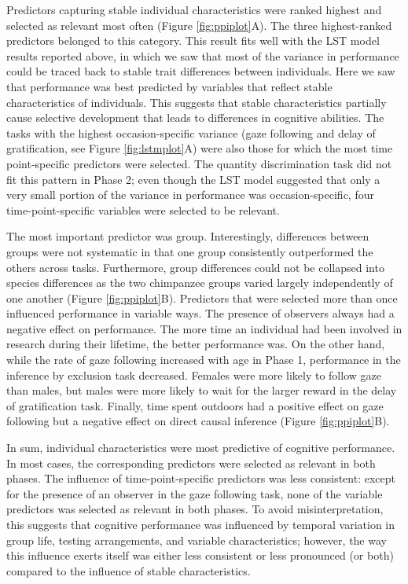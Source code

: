\documentclass[
  man,floatsintext]{apa6}
\begin{document}
Predictors capturing stable individual characteristics were ranked highest and selected as relevant most often (Figure \ref{fig:ppiplot}A). The three highest-ranked predictors belonged to this category. This result fits well with the LST model results reported above, in which we saw that most of the variance in performance could be traced back to stable trait differences between individuals. Here we saw that performance was best predicted by variables that reflect stable characteristics of individuals. This suggests that stable characteristics partially cause selective development that leads to differences in cognitive abilities. The tasks with the highest occasion-specific variance (gaze following and delay of gratification, see Figure \ref{fig:lstmplot}A) were also those for which the most time point-specific predictors were selected. The quantity discrimination task did not fit this pattern in Phase 2; even though the LST model suggested that only a very small portion of the variance in performance was occasion-specific, four time-point-specific variables were selected to be relevant.

The most important predictor was group. Interestingly, differences between groups were not systematic in that one group consistently outperformed the others across tasks. Furthermore, group differences could not be collapsed into species differences as the two chimpanzee groups varied largely independently of one another (Figure \ref{fig:ppiplot}B). Predictors that were selected more than once influenced performance in variable ways. The presence of observers always had a negative effect on performance. The more time an individual had been involved in research during their lifetime, the better performance was. On the other hand, while the rate of gaze following increased with age in Phase 1, performance in the inference by exclusion task decreased. Females were more likely to follow gaze than males, but males were more likely to wait for the larger reward in the delay of gratification task. Finally, time spent outdoors had a positive effect on gaze following but a negative effect on direct causal inference (Figure \ref{fig:ppiplot}B).

In sum, individual characteristics were most predictive of cognitive performance. In most cases, the corresponding predictors were selected as relevant in both phases. The influence of time-point-specific predictors was less consistent: except for the presence of an observer in the gaze following task, none of the variable predictors was selected as relevant in both phases. To avoid misinterpretation, this suggests that cognitive performance was influenced by temporal variation in group life, testing arrangements, and variable characteristics; however, the way this influence exerts itself was either less consistent or less pronounced (or both) compared to the influence of stable characteristics.
\end{document}
